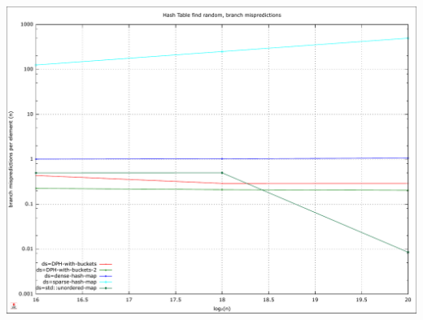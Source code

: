 \documentclass{article}
\begin{document}
\includegraphics[width=\linewidth]{img/hash_find-random_branchmiss}
\raggedright
\end{document}
